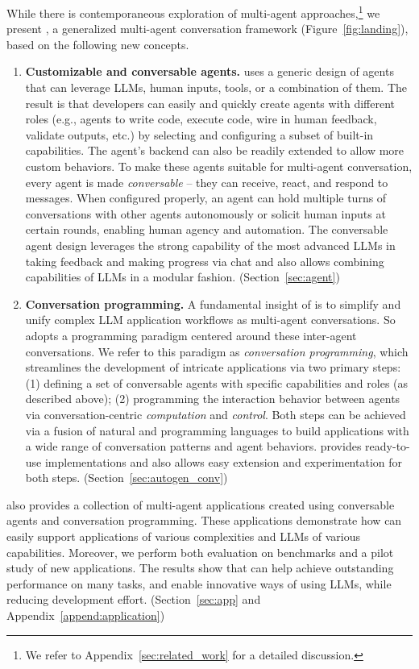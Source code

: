 While there is contemporaneous
exploration of multi-agent approaches,\footnote{
We refer to Appendix~\ref{sec:related_work} for a detailed discussion.} we present \libName, a generalized multi-agent conversation framework (Figure~\ref{fig:landing}), 
based on the following new concepts.
\begin{enumerate}[leftmargin=*]
    \vspace{-2mm}
    \setlength\itemsep{-0.1em}
    \item[1] \textbf{Customizable and conversable agents.} \libName uses a generic design of agents that can leverage LLMs, human inputs, tools, or a combination of them. The result is that developers can easily and quickly create agents with different roles (e.g., agents to write code, execute code, wire in human feedback, validate outputs, etc.) by selecting and configuring a subset of built-in capabilities. The agent's backend can also be readily extended to allow more custom behaviors. 
    To make these agents suitable for multi-agent conversation, every
    agent is made {\em conversable}
    -- they can receive, react, and respond to messages. 
     When configured properly, an agent can hold multiple turns of conversations with other agents autonomously or solicit human inputs at certain rounds, enabling human agency and automation.
     The conversable agent design leverages the strong capability of the most advanced LLMs in taking feedback and making progress via chat
    and also allows combining capabilities of LLMs in a modular fashion.   (Section~\ref{sec:agent}) 

    \item[2] \textbf{Conversation programming.} 
    A fundamental insight of \libName is to simplify and unify complex LLM application workflows as multi-agent conversations.
    So \libName adopts a programming paradigm centered around these inter-agent conversations. We refer to this paradigm as \emph{conversation programming},  which streamlines the development of intricate 
    applications
    via two primary steps: (1) defining a set of conversable agents with specific capabilities
    and roles (as described above); (2) programming the interaction behavior between agents via conversation-centric \emph{computation} and \emph{control}. 
    Both steps can be achieved via a fusion of natural and programming languages to build applications with a wide range of conversation patterns and agent behaviors. \libName provides ready-to-use implementations and also allows easy extension and experimentation for both steps. 
    (Section~\ref{sec:autogen_conv})
  
\end{enumerate}

\libName also provides a collection of multi-agent applications created using conversable agents and conversation programming.  
These applications demonstrate how \libName can easily 
support applications of various complexities and LLMs of various capabilities. 
Moreover, we perform both evaluation on benchmarks and a pilot study of new applications. The results show that \libName can help achieve outstanding performance on many tasks, and enable innovative ways of using LLMs, while reducing development effort. (Section~\ref{sec:app} and Appendix~\ref{append:application})  
